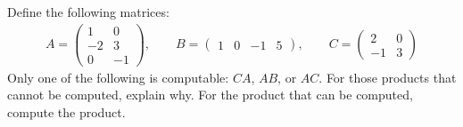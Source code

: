 \documentclass[11pt,letterpaper]{article}
\begin{document}
 Define the following matrices:
	\[
	\begin{aligned}
	A= \begin{pmatrix} 1 & 0 \\ -2 & 3 \\ 0 & -1 \end{pmatrix}, \qquad B= \begin{pmatrix} 1 & 0 & -1 & 5 \end{pmatrix}, \qquad C= \begin{pmatrix} 2 & 0 \\ -1 & 3 \end{pmatrix}
	\end{aligned}
	\]
Only one of the following is computable: $CA$, $AB$, or $AC$. For those products that cannot be computed, explain why. For the product that can be computed, compute the product.  
\end{document}
